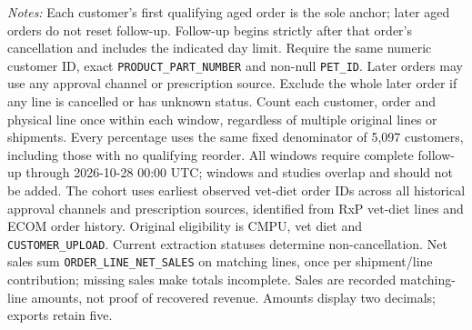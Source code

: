 \begin{table}[!htbp]
\begin{minipage}{\linewidth}
\footnotesize
\textit{Notes:} Each customer's first qualifying aged order is the sole anchor;
later aged orders do not reset follow-up. Follow-up begins strictly after that
order's cancellation and includes the indicated day limit. Require the same
numeric customer ID, exact \texttt{PRODUCT\_PART\_NUMBER} and non-null
\texttt{PET\_ID}. Later orders may use any approval channel or prescription
source. Exclude the whole later order if any line is cancelled or has unknown
status. Count each customer, order and physical line once within each window,
regardless of multiple original lines or shipments. Every percentage uses the
same fixed denominator of 5,097 customers, including those with no
qualifying reorder. All windows require complete follow-up through
2026-10-28 00:00 UTC; windows and studies overlap and should not be added.
The cohort uses earliest observed vet-diet order IDs across all historical approval channels and prescription sources, identified from RxP vet-diet lines and ECOM order history. Original eligibility is CMPU,
vet diet and \texttt{CUSTOMER\_UPLOAD}. Current extraction statuses determine
non-cancellation. Net sales sum \texttt{ORDER\_LINE\_NET\_SALES} on matching
lines, once per shipment/line contribution; missing sales make totals incomplete.
Sales are recorded matching-line amounts, not proof of recovered revenue.
Amounts display two decimals; exports retain five.
\end{minipage}
\end{table}
